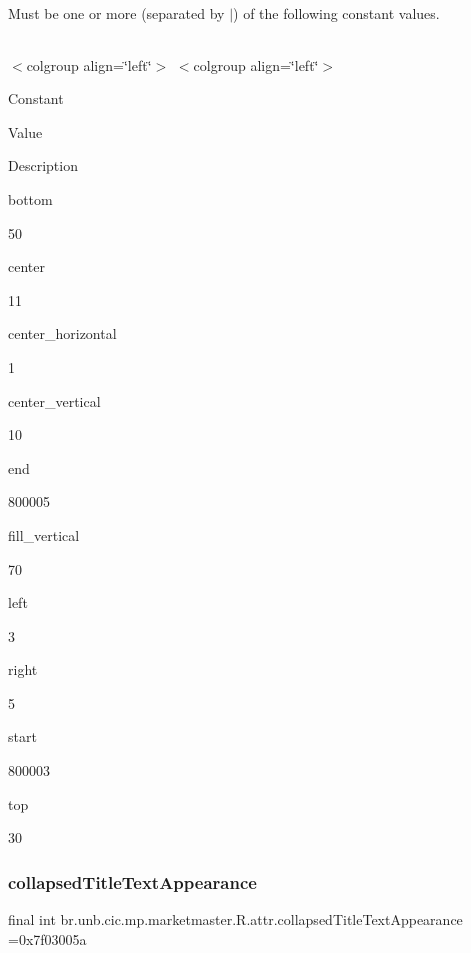 Must be one or more (separated by \textquotesingle{}$\vert$\textquotesingle{}) of the following constant values.

\tabulinesep=1mm
\begin{longtabu} spread 0pt [c]{*{0}{|X[-1]}|}
\hline
\end{longtabu}
$<$colgroup align=\char`\"{}left\char`\"{}$>$ $<$colgroup align=\char`\"{}left\char`\"{}$>$ 

Constant

Value

Description 

bottom

50

center

11

center\+\_\+horizontal

1

center\+\_\+vertical

10

end

800005

fill\+\_\+vertical

70

left

3

right

5

start

800003

top

30\mbox{\label{classbr_1_1unb_1_1cic_1_1mp_1_1marketmaster_1_1R_1_1attr_ab2f52a926509d487b7aa232142ec017c}} 
\subsubsection{\texorpdfstring{collapsed\+Title\+Text\+Appearance}{collapsedTitleTextAppearance}}
{\footnotesize\ttfamily final int br.\+unb.\+cic.\+mp.\+marketmaster.\+R.\+attr.\+collapsed\+Title\+Text\+Appearance =0x7f03005a\hspace{0.3cm}{\ttfamily [static]}}

